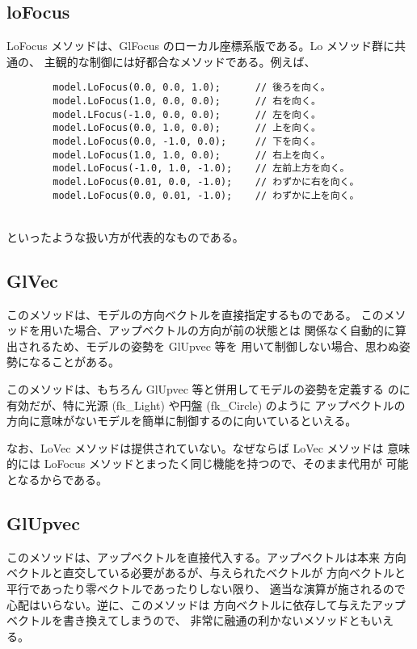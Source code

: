 \subsection{loFocus}
LoFocus メソッドは、GlFocus のローカル座標系版である。Lo メソッド群に共通の、
主観的な制御には好都合なメソッドである。例えば、
\\
\begin{breakbox}
\begin{verbatim}
        model.LoFocus(0.0, 0.0, 1.0);      // 後ろを向く。
        model.LoFocus(1.0, 0.0, 0.0);      // 右を向く。
        model.LFocus(-1.0, 0.0, 0.0);      // 左を向く。
        model.LoFocus(0.0, 1.0, 0.0);      // 上を向く。
        model.LoFocus(0.0, -1.0, 0.0);     // 下を向く。
        model.LoFocus(1.0, 1.0, 0.0);      // 右上を向く。
        model.LoFocus(-1.0, 1.0, -1.0);    // 左前上方を向く。
        model.LoFocus(0.01, 0.0, -1.0);    // わずかに右を向く。
        model.LoFocus(0.0, 0.01, -1.0);    // わずかに上を向く。
\end{verbatim}
\end{breakbox}
~ \\
といったような扱い方が代表的なものである。

\subsection{GlVec}
このメソッドは、モデルの方向ベクトルを直接指定するものである。
このメソッドを用いた場合、アップベクトルの方向が前の状態とは
関係なく自動的に算出されるため、モデルの姿勢を GlUpvec 等を
用いて制御しない場合、思わぬ姿勢になることがある。

このメソッドは、もちろん GlUpvec 等と併用してモデルの姿勢を定義する
のに有効だが、特に光源 (fk\_Light) や円盤 (fk\_Circle) のように
アップベクトルの方向に意味がないモデルを簡単に制御するのに向いているといえる。

なお、LoVec メソッドは提供されていない。なぜならば LoVec メソッドは
意味的には LoFocus メソッドとまったく同じ機能を持つので、そのまま代用が
可能となるからである。

\subsection{GlUpvec}
このメソッドは、アップベクトルを直接代入する。アップベクトルは本来
方向ベクトルと直交している必要があるが、与えられたベクトルが
方向ベクトルと平行であったり零ベクトルであったりしない限り、
適当な演算が施されるので心配はいらない。逆に、このメソッドは
方向ベクトルに依存して与えたアップベクトルを書き換えてしまうので、
非常に融通の利かないメソッドともいえる。

